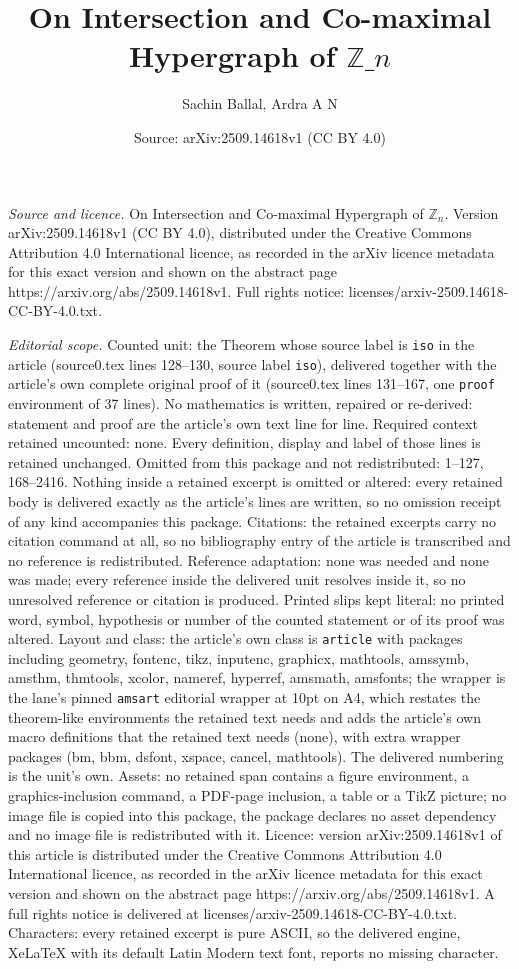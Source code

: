 \documentclass[10pt,a4paper]{amsart}
\title[On Intersection and Co-maximal Hypergraph of $\mathbb{Z}\_n$]{On Intersection and Co-maximal Hypergraph of $\mathbb{Z}\_n$}
\author{Sachin Ballal, Ardra A N}
\date{Source: arXiv:2509.14618v1 (CC BY 4.0)}
\begin{document}
\maketitle

\noindent\emph{Source and licence.} On Intersection and Co-maximal Hypergraph of $\mathbb{Z}_n$. Version arXiv:2509.14618v1 (CC BY 4.0), distributed under the Creative Commons Attribution 4.0 International licence, as recorded in the arXiv licence metadata for this exact version and shown on the abstract page https://arxiv.org/abs/2509.14618v1. Full rights notice: licenses/arxiv-2509.14618-CC-BY-4.0.txt.\par\smallskip

\noindent\textit{Editorial scope.} Counted unit: the Theorem whose source label is \texttt{iso} in the article (source0.tex lines 128--130, source label \texttt{iso}), delivered together with the article's own complete original proof of it (source0.tex lines 131--167, one \texttt{proof} environment of 37 lines). No mathematics is written, repaired or re-derived: statement and proof are the article's own text line for line. Required context retained uncounted: none. Every definition, display and label of those lines is retained unchanged. Omitted from this package and not redistributed: 1--127, 168--2416. Nothing inside a retained excerpt is omitted or altered: every retained body is delivered exactly as the article's lines are written, so no omission receipt of any kind accompanies this package. Citations: the retained excerpts carry no citation command at all, so no bibliography entry of the article is transcribed and no reference is redistributed. Reference adaptation: none was needed and none was made; every reference inside the delivered unit resolves inside it, so no unresolved reference or citation is produced. Printed slips kept literal: no printed word, symbol, hypothesis or number of the counted statement or of its proof was altered. Layout and class: the article's own class is \texttt{article} with packages including geometry, fontenc, tikz, inputenc, graphicx, mathtools, amssymb, amsthm, thmtools, xcolor, nameref, hyperref, amsmath, amsfonts; the wrapper is the lane's pinned \texttt{amsart} editorial wrapper at 10pt on A4, which restates the theorem-like environments the retained text needs and adds the article's own macro definitions that the retained text needs (none), with extra wrapper packages (bm, bbm, dsfont, xspace, cancel, mathtools). The delivered numbering is the unit's own. Assets: no retained span contains a figure environment, a graphics-inclusion command, a PDF-page inclusion, a table or a TikZ picture; no image file is copied into this package, the package declares no asset dependency and no image file is redistributed with it. Licence: version arXiv:2509.14618v1 of this article is distributed under the Creative Commons Attribution 4.0 International licence, as recorded in the arXiv licence metadata for this exact version and shown on the abstract page https://arxiv.org/abs/2509.14618v1. A full rights notice is delivered at licenses/arxiv-2509.14618-CC-BY-4.0.txt. Characters: every retained excerpt is pure ASCII, so the delivered engine, XeLaTeX with its default Latin Modern text font, reports no missing character.
\end{document}
